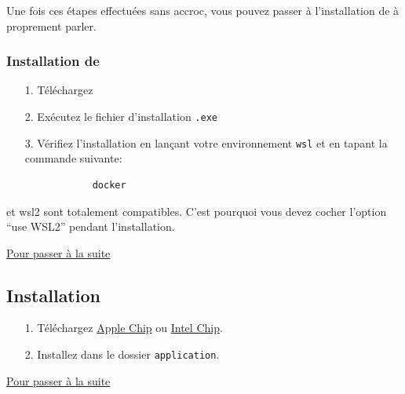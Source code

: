     Une fois ces étapes effectuées sans accroc, vous pouvez passer à l'installation de \dockerdesktop{} à proprement parler.

    \subsubsection[Installation de Docker Desktop]{Installation de \dockerdesktop}
    
    \begin{itemize}
        \item[1.] Téléchargez \href{https://desktop.docker.com/win/main/amd64/Docker%20Desktop%20Installer.exe}{\dockerdesktop{}}
        
        \item[2.] Exécutez le fichier d'installation \verb|.exe|
        
        \item[3.] Vérifiez l'installation en lançant votre environnement \verb|wsl| et en tapant la commande suivante:
        \begin{lstlisting}
            docker
        \end{lstlisting}
    \end{itemize}

    \docker{} et wsl2 sont totalement compatibles. C'est pourquoi vous devez cocher l'option ``use WSL2'' pendant l'installation. 

    \hyperref[sec:suite_installation]{Pour passer à la suite}

\newpage
\subsection[Installation MacOS]{Installation \macos{}\label{sec:installation_macos}}

    \begin{itemize}
        \item[1.] Téléchargez \dockerdesktop{} \href{https://desktop.docker.com/mac/main/arm64/Docker.dmg?utm_source=docker&utm_medium=webreferral&utm_campaign=dd-smartbutton&utm_location=module}{Apple Chip} ou \href{https://desktop.docker.com/mac/main/amd64/Docker.dmg?utm_source=docker&utm_medium=webreferral&utm_campaign=dd-smartbutton&utm_location=module}{Intel Chip}.
        \item[2.] Installez \dockerdesktop{} dans le dossier \verb|application|.
    \end{itemize}

    \hyperref[sec:suite_installation]{Pour passer à la suite}

